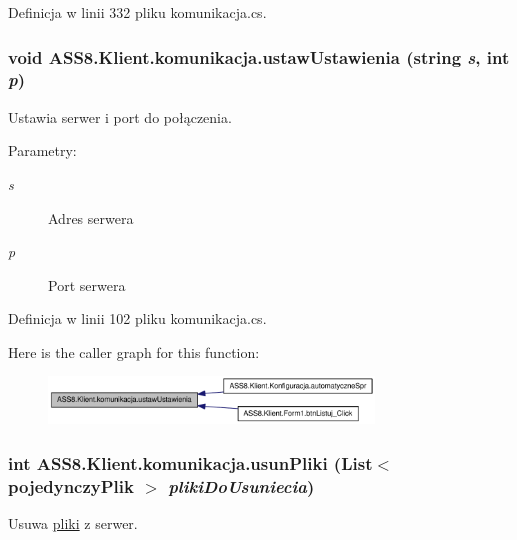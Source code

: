 Definicja w linii 332 pliku komunikacja.cs.\hypertarget{a00013_da808f405d71a8f5f06659bac3b3fe50}{
\subsubsection[{ustawUstawienia}]{\setlength{\rightskip}{0pt plus 5cm}void ASS8.Klient.komunikacja.ustawUstawienia (string {\em s}, \/  int {\em p})}}
\label{d7/dd4/a00013_da808f405d71a8f5f06659bac3b3fe50}


Ustawia serwer i port do połączenia. 

\begin{Desc}
\item[Parametry:]
\begin{description}
\item[{\em s}]Adres serwera\item[{\em p}]Port serwera\end{description}
\end{Desc}


Definicja w linii 102 pliku komunikacja.cs.

Here is the caller graph for this function:\nopagebreak
\begin{figure}[H]
\begin{center}
\leavevmode
\includegraphics[width=245pt]{d7/dd4/a00013_da808f405d71a8f5f06659bac3b3fe50_icgraph}
\end{center}
\end{figure}
\hypertarget{a00013_302b89f984b2f9c695f1ae9462414d84}{
\subsubsection[{usunPliki}]{\setlength{\rightskip}{0pt plus 5cm}int ASS8.Klient.komunikacja.usunPliki (List$<$ {\bf pojedynczyPlik} $>$ {\em plikiDoUsuniecia})}}
\label{d7/dd4/a00013_302b89f984b2f9c695f1ae9462414d84}


Usuwa \hyperlink{a00017}{pliki} z serwer. 

